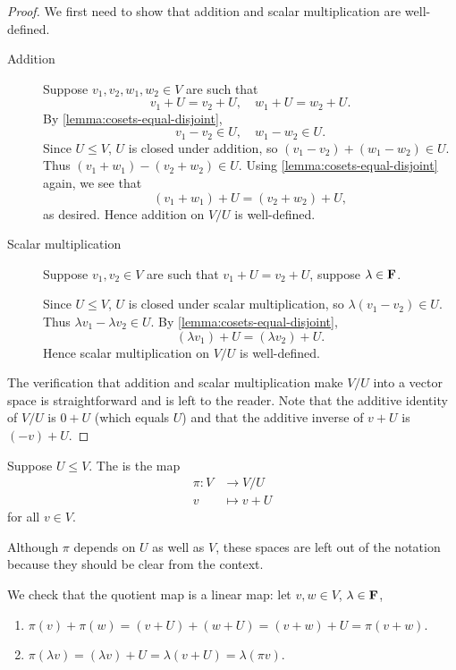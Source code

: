 \begin{proof}
We first need to show that addition and scalar multiplication are well-defined.
\begin{description}
\item[Addition] Suppose $v_1,v_2,w_1,w_2\in V$ are such that
\[v_1+U=v_2+U,\quad w_1+U=w_2+U.\]
By \ref{lemma:cosets-equal-disjoint},
\[v_1-v_2\in U,\quad w_1-w_2\in U.\]
Since $U\le V$, $U$ is closed under addition, so $(v_1-v_2)+(w_1-w_2)\in U$. Thus $(v_1+w_1)-(v_2+w_2)\in U$. Using \ref{lemma:cosets-equal-disjoint} again, we see that
\[(v_1+w_1)+U=(v_2+w_2)+U,\]
as desired. 
Hence addition on $V/U$ is well-defined.

\item[Scalar multiplication] Suppose $v_1,v_2\in V$ are such that $v_1+U=v_2+U$, suppose $\lambda\in\mathbf F$.

Since $U\le V$, $U$ is closed under scalar multiplication, so $\lambda(v_1-v_2)\in U$. Thus $\lambda v_1-\lambda v_2\in U$. By \ref{lemma:cosets-equal-disjoint},
\[(\lambda v_1)+U=(\lambda v_2)+U.\]
Hence scalar multiplication on $V/U$ is well-defined.
\end{description}

The verification that addition and scalar multiplication make $V/U$ into a vector space is straightforward and is left to the reader. Note that the additive identity of $V/U$ is $0+U$ (which equals $U$) and that the additive inverse of $v+U$ is $(-v)+U$.
\end{proof}

\begin{definition}
Suppose $U\le V$. The  is the map
\begin{align*}
\pi:V&\to V/U\\
v&\mapsto v+U
\end{align*}
for all $v\in V$.
\end{definition}

\begin{notation}
Although $\pi$ depends on $U$ as well as $V$, these spaces are left out of the notation because they should be clear from the context.
\end{notation}

We check that the quotient map is a linear map: let $v,w\in V$, $\lambda\in\mathbf F$,
\begin{enumerate}[label=(\roman*)]
\item $\pi(v)+\pi(w)=(v+U)+(w+U)=(v+w)+U=\pi(v+w)$.
\item $\pi(\lambda v)=(\lambda v)+U=\lambda(v+U)=\lambda(\pi v)$.
\end{enumerate}

